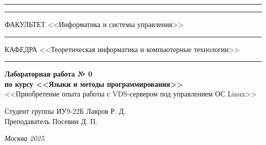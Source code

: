 \documentclass[a4paper, 14pt]{extarticle}
\begin{document}
\begin{titlepage}
\vspace{-25pt}
\hspace{-35pt}\rule{\textwidth}{2.3pt}

\vspace*{-20.3pt}
\hspace{-35pt}\rule{\textwidth}{0.4pt}

\vspace{1.5ex}
\hspace{-35pt} \noindent \small ФАКУЛЬТЕТ\hspace{80pt} <<Информатика и системы управления>>

\vspace*{-16pt}
\hspace{47pt}\rule{0.83\textwidth}{0.4pt}

\vspace{0.5ex}
\hspace{-35pt} \noindent \small КАФЕДРА\hspace{85pt} <<Теоретическая информатика и компьютерные технологии>>

\vspace*{-16pt}
\hspace{30pt}\rule{0.866\textwidth}{0.4pt}
  
\vspace{11em}

\begin{center}
\Large {\bf Лабораторная работа № 0} \\ 
\large {\bf по курсу <<Языки и методы программирования>>} \\
\large <<Приобретение опыта работы с VDS-сервером под управлением ОС Linux>> 
\end{center}\normalsize

\vspace{8em}


\begin{flushright}
  {Студент группы ИУ9-22Б Лавров Р. Д. \hspace*{15pt}\\ 
  \vspace{2ex}
  Преподаватель Посевин Д. П.\hspace*{15pt}}
\end{flushright}

\bigskip

\vfill
 

\begin{center}
\textsl{Москва 2025}
\end{center}
\end{titlepage}
\end{document}
